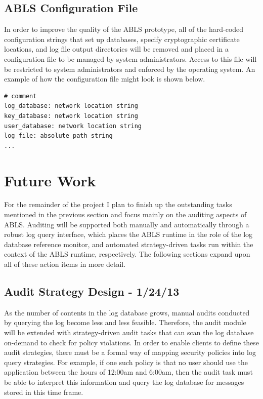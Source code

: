 \documentclass{sig-alternate}
\begin{document}
\subsection{ABLS Configuration File} 
In order to improve the quality of the ABLS prototype, all of the hard-coded configuration strings that set up databases,
specify cryptographic certificate locations, and log file output directories will be removed and placed in a configuration file
to be managed by system administrators. Access to this file will be restricted to system administrators and enforced by the 
operating system. An example of how the configuration file might look is shown below.

\begin{lstlisting}
# comment
log_database: network location string
key_database: network location string
user_database: network location string
log_file: absolute path string
...
\end{lstlisting}

\section{Future Work}
For the remainder of the project I plan to finish up the outstanding tasks mentioned in the previous section and 
focus mainly on the auditing aspects of ABLS. Auditing will be supported both manually and automatically through
a robust log query interface, which places the ABLS runtime in the role of the log database reference monitor, and 
automated strategy-driven tasks run within the context of the ABLS runtime, respectively. The following 
sections expand upon all of these action items in more detail.

\subsection{Audit Strategy Design - 1/24/13}
As the number of contents in the log database grows, manual audits conducted by querying the log become less and less 
feasible. Therefore, the audit module will be extended with strategy-driven audit tasks that can scan the log database 
on-demand to check for policy violations. In order to enable clients to define these audit strategies, there must be a 
formal way of mapping security policies into log query strategies. For example, if one such policy is that no user should use 
the application between the hours of 12:00am and 6:00am, then the audit task must be able to interpret this information
and query the log database for messages stored in this time frame. 
\end{document}
